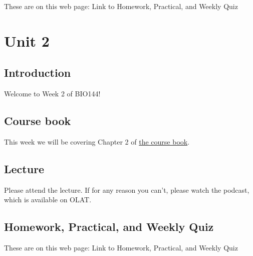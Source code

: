 \documentclass[
  letterpaper,
  8pt,
  a4paper]{book}
\begin{document}

These are on this web page: Link to Homework, Practical, and Weekly Quiz


\chapter*{Unit 2}\label{unit-2}


\section*{Introduction}\label{introduction-2}


Welcome to Week 2 of BIO144!

\section*{Course book}\label{course-book-1}


This week we will be covering Chapter 2 of
\href{https://opetchey.github.io/BIO144_Course_Book/}{the course book}.

\section*{Lecture}\label{lecture-1}


Please attend the lecture. If for any reason you can't, please watch the
podcast, which is available on OLAT.

\section*{Homework, Practical, and Weekly
Quiz}\label{homework-practical-and-weekly-quiz-1}


These are on this web page: Link to Homework, Practical, and Weekly Quiz
\end{document}
